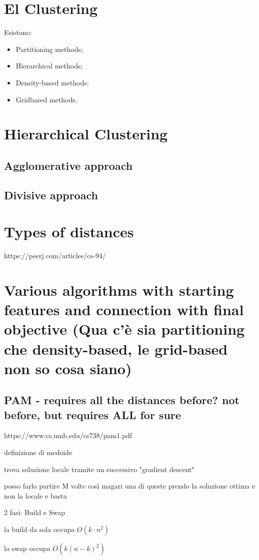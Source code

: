 \section{El Clustering}
Esistono:
\begin{itemize}
    \item Partitioning methods;
    \item Hierarchical methods;
    \item Density-based methods;
    \item Gridbased methods.
\end{itemize}\section{Hierarchical Clustering}
\subsection{Agglomerative approach}
\subsection{Divisive approach}
\section{Types of distances}
https://peerj.com/articles/cs-94/

\section{Various algorithms with starting features and connection with final objective (Qua c'è sia partitioning che density-based, le grid-based non so cosa siano)}
\subsection{PAM - requires all the distances before? not before, but requires ALL for sure}
https://www.cs.umb.edu/cs738/pam1.pdf

definizione di medoide

trova soluzione locale tramite un successivo "gradient descent"

posso farlo partire M volte così magari una di queste prendo la soluzione ottima e non la locale e basta

2 fasi: Build e Swap

la build da sola occupa $O(k\cdot n^2)$

lo swap occupa $O(k(n-k)^2)$


